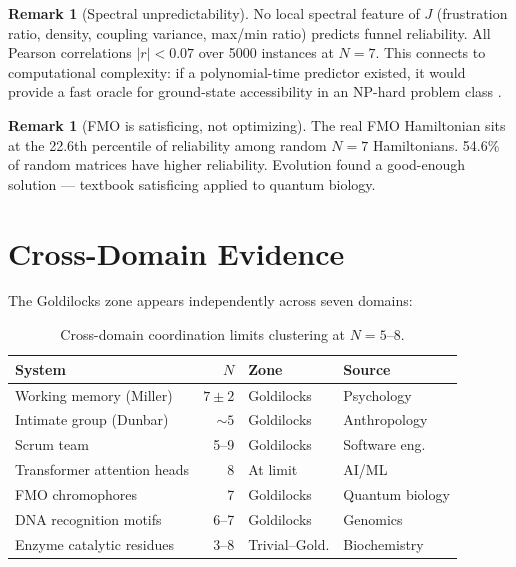 \documentclass[11pt]{amsart}
\theoremstyle{definition}
\newtheorem{remark}[theorem]{Remark}
\begin{document}
\begin{remark}[Spectral unpredictability]
No local spectral feature of $J$ (frustration ratio, density, coupling variance, max/min ratio) predicts funnel reliability. All Pearson correlations $|r| < 0.07$ over 5000 instances at $N = 7$. This connects to computational complexity: if a polynomial-time predictor existed, it would provide a fast oracle for ground-state accessibility in an NP-hard problem class \cite{barahona1982}.
\end{remark}

\begin{remark}[FMO is satisficing, not optimizing]
The real FMO Hamiltonian \cite{adolphs2006} sits at the 22.6th percentile of reliability among random $N = 7$ Hamiltonians. 54.6\% of random matrices have higher reliability. Evolution found a good-enough solution --- textbook satisficing \cite{simon1956} applied to quantum biology.
\end{remark}


\section{Cross-Domain Evidence}
\label{sec:crossdomain}

The Goldilocks zone appears independently across seven domains:

\begin{table}[ht]
\centering
\caption{Cross-domain coordination limits clustering at $N = 5$--$8$.}
\label{tab:crossdomain}
\begin{tabular}{l r l l}
\toprule
System & $N$ & Zone & Source \\
\midrule
Working memory (Miller) & $7 \pm 2$ & Goldilocks & Psychology \cite{miller1956} \\
Intimate group (Dunbar) & $\sim 5$ & Goldilocks & Anthropology \cite{dunbar1992} \\
Scrum team & 5--9 & Goldilocks & Software eng.\ \cite{schwaber2020} \\
Transformer attention heads & 8 & At limit & AI/ML \\
FMO chromophores & 7 & Goldilocks & Quantum biology \cite{engel2007} \\
DNA recognition motifs & 6--7 & Goldilocks & Genomics \cite{luscombe2001} \\
Enzyme catalytic residues & 3--8 & Trivial--Gold. & Biochemistry \cite{porter2004} \\
\bottomrule
\end{tabular}
\end{table}
\end{document}
